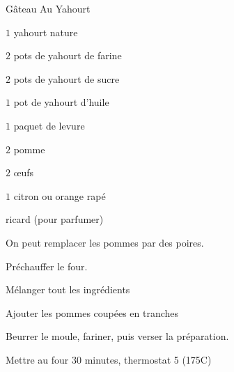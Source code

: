 \begin{recette}{Gâteau Au Yahourt}

\begin{ingredients}
\item $1$ yahourt nature
\item $2$ pots de yahourt de farine
\item $2$ pots de yahourt de sucre
\item $1$ pot de yahourt d'huile
\item $1$ paquet de levure
\item $2$ pomme
\item $2$ œufs
\item $1$ citron ou orange rapé
\item ricard (pour parfumer)
\end{ingredients}

\begin{remarque}
On peut remplacer les pommes par des poires.
\end{remarque}

\begin{preparation}
\item Préchauffer le four.
\item Mélanger tout les ingrédients
\item Ajouter les pommes coupées en tranches
\item Beurrer le moule, fariner, puis verser la préparation.
\end{preparation}

\begin{cuisson}
Mettre au four 30 minutes, thermostat 5 (175\degres C)
\end{cuisson}
\end{recette}

